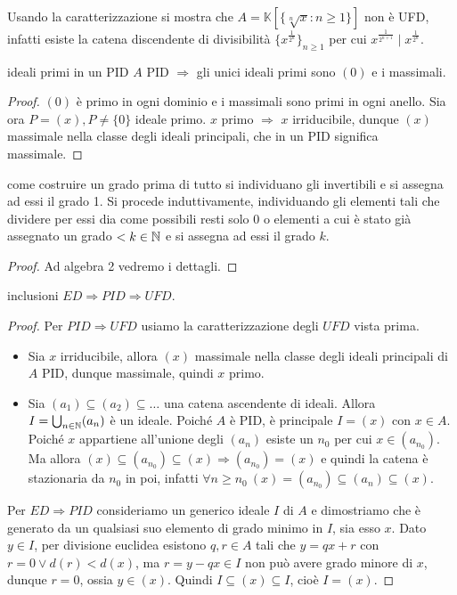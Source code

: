\begin{example}
    Usando la caratterizzazione si mostra che $A = \mathbb{K}[ \{ \sqrt[n]{x} : n \ge 1 \} ]$ non è UFD, infatti esiste la catena discendente di divisibilità $\{ x^{\frac{1}{2^n}} \}_{n \ge 1}$ per cui $x^{\frac1{2^{n+1}}} \mid x^{\frac1{2^n}}$.
\end{example}
\begin{theorem}{ideali primi in un PID}
    $A$ PID $\Rightarrow$ gli unici ideali primi sono $(0)$ e i massimali.
\end{theorem}
\begin{proof}
    $(0)$ è primo in ogni dominio e i massimali sono primi in ogni anello. Sia ora $P = (x), P \neq \{ 0 \}$ ideale primo. $x$ primo $\Rightarrow$ $x$ irriducibile, dunque $(x)$ massimale nella classe degli ideali principali, che in un PID significa massimale.
\end{proof}
\begin{proposition}{come costruire un grado}
    prima di tutto si individuano gli invertibili e si assegna ad essi il grado 1. Si procede induttivamente, individuando gli elementi tali che dividere per essi dia come possibili resti solo 0 o elementi a cui è stato già assegnato un grado $< k \in \mathbb{N}$ e si assegna ad essi il grado $k$.
\end{proposition}
\begin{proof}
    Ad algebra 2 vedremo i dettagli.
\end{proof}
\begin{theorem}{inclusioni}
    $ED \Rightarrow PID \Rightarrow UFD$.
\end{theorem}
\begin{proof}
    Per $PID \Rightarrow UFD$ usiamo la caratterizzazione degli $UFD$ vista prima. 
    \begin{itemize}
        \item[$(i)$] Sia $x$ irriducibile, allora $(x)$ massimale nella classe degli ideali principali di $A$ PID, dunque massimale, quindi $x$ primo.
        \item[$(ii)$] Sia $(a_1) \subseteq (a_2) \subseteq \dots$ una catena ascendente di ideali. Allora $I = \bigcup_{n \in \mathbb{N}} (a_n)$ è un ideale. Poiché $A$ è PID, è principale $I = (x)$ con $x \in A$. Poiché $x$ appartiene all'unione degli $(a_n)$ esiste un $n_0$ per cui $x \in (a_{n_0})$. Ma allora $(x) \subseteq (a_{n_0}) \subseteq (x) \Rightarrow (a_{n_0}) = (x)$ e quindi la catena è stazionaria da $n_0$ in poi, infatti $\forall n \ge n_0 \ (x) = (a_{n_0}) \subseteq (a_n) \subseteq (x)$.
    \end{itemize}
    Per $ED \Rightarrow PID$ consideriamo un generico ideale $I$ di $A$ e dimostriamo che è generato da un qualsiasi suo elemento di grado minimo in $I$, sia esso $x$. Dato $y \in I$, per divisione euclidea esistono $q,r \in A$ tali che $y = qx+r$ con $r = 0 \lor d(r) < d(x)$, ma $r = y-qx \in I$ non può avere grado minore di $x$, dunque $r = 0$, ossia $y \in (x)$. Quindi $I \subseteq (x) \subseteq I$, cioè $I = (x)$.
\end{proof}
